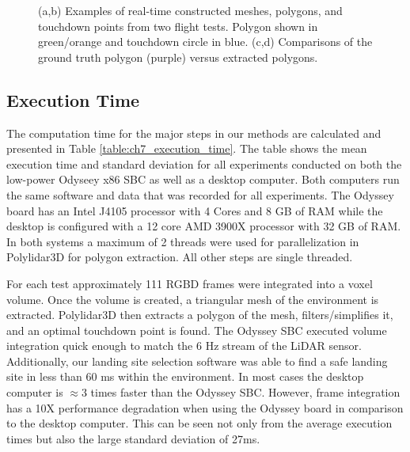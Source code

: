 \begin{figure}[!htb]
\begin{subfigure}[t]{.35\linewidth}
    \caption{\label{fig:ch7_flight_poly_b}}
  \end{subfigure}
  \caption[Real-time constructed meshes and polygons during flight test]{(a,b) Examples of real-time constructed meshes, polygons, and touchdown points from two flight tests. Polygon shown in green/orange and touchdown circle in blue. (c,d) Comparisons of the ground truth polygon (purple) versus extracted polygons. }\label{fig:ch7_mesh_flight}
\end{figure}




\subsection{Execution Time} \label{sec:ch7_results_execution_time}

The computation time for the major steps in our methods are calculated and presented in Table \ref{table:ch7_execution_time}. The table shows the mean execution time and standard deviation for all experiments conducted on both the low-power Odyseey x86 \ac{SBC} as well as a desktop computer. Both computers run the same software and data that was recorded for all experiments. The Odyssey board has an Intel J4105 processor with 4 Cores and 8 GB of RAM while the desktop is configured with a 12 core AMD 3900X processor with 32 GB of RAM. In both systems a maximum of 2 threads were used for parallelization in Polylidar3D for polygon extraction. All other steps are single threaded. 

For each test approximately 111 \ac{RGBD} frames were integrated into a voxel volume.  Once the volume is created, a triangular mesh of the environment is extracted.  Polylidar3D then extracts a polygon of the mesh, filters/simplifies it, and an optimal touchdown point is found. The Odyssey \ac{SBC} executed volume integration quick enough to match the 6 Hz stream of the LiDAR sensor. Additionally, our landing site selection software was able to find a safe landing site in less than 60 ms within the environment. In most cases the desktop computer is $\approx3$ times faster than the Odyssey \ac{SBC}. However, frame integration has a 10X performance degradation when using the Odyssey board in comparison to the desktop computer.  This can be seen not only from the average execution times but also the large standard deviation of 27ms. 

